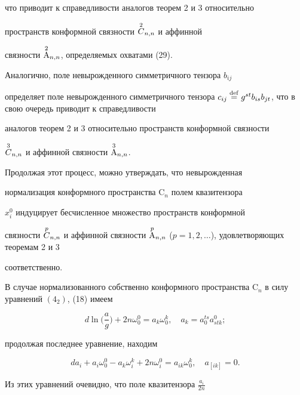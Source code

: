 что приводит к справедливости аналогов теорем 2 и 3 относительно 


пространств конформной связности $\overset{2}{C}{}{}_{n,n}$ и аффинной 


связности $\overset{2}{\mathrm A}{}{}_{n,n}$, определяемых охватами (29). 


 


Аналогично, поле невырожденного симметричного тензора $b_{i j}$ 


определяет поле невырожденного симметричного тензора $c_{i j}\defeq 


g^{s t}b_{is}b_{j t}$, что в свою очередь приводит к справедливости 


аналогов теорем 2 и 3 относительно пространств конформной связности 


$\overset{3}{C}{}{}_{n,n}$ и аффинной связности $\overset{3}{\mathrm A}{}{}_{n,n}$. 


 


Продолжая этот процесс, можно утверждать, что невырожденная 


нормализация конформного пространства $\mathrm C_n$ полем квазитензора 


$x^0_i$ индуцирует бесчисленное множество пространств конформной 


связности $\up{p}{C}{}_{n,n}$ и аффинной связности $\up{p}{\mathrm 


A}{}_{n,n}$ ($p=1,2,\dotsc$), удовлетворяющих теоремам 2 и 3 


соответственно. 


 


В случае нормализованного собственно конформного пространства $\mathrm 


C_n$ в силу уравнений $(4_2)$, (18) имеем 


$$ 


d\ln\bigg(\frac{a}{g} \bigg)+2n\omega^0_0=a_k\omega^k_0,\quad 


a_k=a^{t s}_0a^0_{s t k}; 


$$ 


продолжая последнее уравнение, находим 


$$ 


d a_i+a_i\omega^0_0-a_k\omega^k_i+2n\omega^0_i= 


a_{i k}\omega^k_0,\quad a_{[i k]}=0. 


$$ 


Из этих уравнений очевидно, что поле квазитензора $\frac{a_i}{2n}$ 


